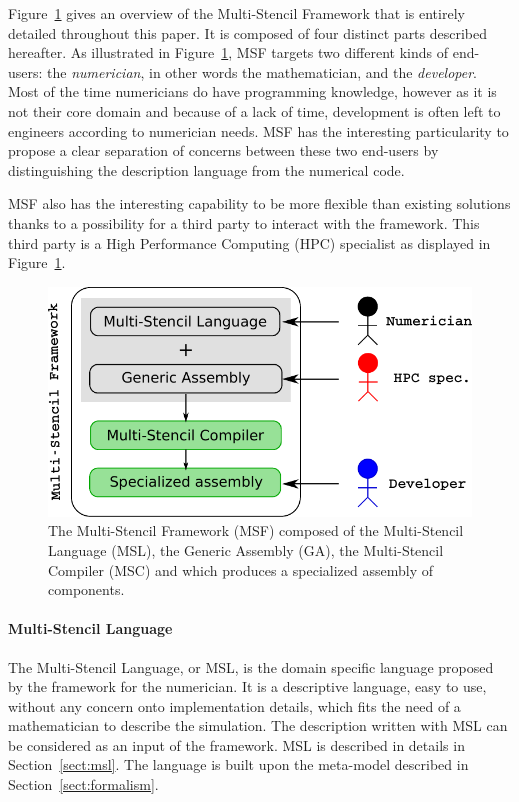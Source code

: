 Figure~\ref{fig:msf} gives an overview of the Multi-Stencil Framework that is entirely detailed throughout this paper. It is composed of four distinct parts described hereafter.
As illustrated in Figure~\ref{fig:msf}, MSF targets two different kinds of end-users: the \emph{numerician}, in other words the mathematician, and the \emph{developer}. Most of the time numericians do have programming knowledge, however as it is not their core domain and because of a lack of time, development is often left to engineers according to numerician needs. MSF has the interesting particularity to propose a clear separation of concerns between these two end-users by distinguishing the description language from the numerical code. 

MSF also has the interesting capability to be more flexible than existing solutions thanks to a possibility for a third party to interact with the framework. This third party is a High Performance Computing (HPC) specialist as displayed in Figure~\ref{fig:msf}.

\begin{figure}[t]
\begin{center}
  \includegraphics[width=.6\textwidth]{./images/msf.pdf}
  \caption{The Multi-Stencil Framework (MSF) composed of the Multi-Stencil Language (MSL), the Generic Assembly (GA), the Multi-Stencil Compiler (MSC) and which produces a specialized assembly of components.}
  \label{fig:msf}
\end{center}
\end{figure}

\paragraph{\textbf{Multi-Stencil Language}}
The Multi-Stencil Language, or MSL, is the domain specific language proposed by the framework for the numerician. It is a descriptive language, easy to use, without any concern onto implementation details, which fits the need of a mathematician to describe the simulation. The description written with MSL can be considered as an input of the framework. MSL is described in details in Section~\ref{sect:msl}. The language is built upon the meta-model described in Section~\ref{sect:formalism}.

